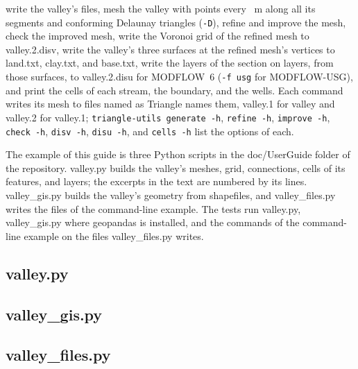 \documentclass[11pt,twoside,twocolumn]{usgsreport}
\begin{document}

\noindent write the valley's files, mesh the valley with points every \boundaryspacing~m along all its segments and conforming Delaunay triangles (\texttt{-D}), refine and improve the mesh, check the improved mesh, write the Voronoi grid of the refined mesh to valley.2.disv, write the valley's three surfaces at the refined mesh's vertices to land.txt, clay.txt, and base.txt, write the layers of the section on layers, from those surfaces, to valley.2.disu for MODFLOW~6 (\texttt{-f usg} for MODFLOW-USG), and print the cells of each stream, the boundary, and the wells. Each command writes its mesh to files named as Triangle names them, valley.1 for valley and valley.2 for valley.1; \texttt{triangle-utils generate -h}, \texttt{refine -h}, \texttt{improve -h}, \texttt{check -h}, \texttt{disv -h}, \texttt{disu -h}, and \texttt{cells -h} list the options of each.

\REFSECTION



\begin{appendix}
\label{appendix:listings}

The example of this guide is three Python scripts in the doc/UserGuide folder of the repository. valley.py builds the valley's meshes, grid, connections, cells of its features, and layers; the excerpts in the text are numbered by its lines. valley\_gis.py builds the valley's geometry from shapefiles, and valley\_files.py writes the files of the command-line example. The tests run valley.py, valley\_gis.py where geopandas is installed, and the commands of the command-line example on the files valley\_files.py writes.

\subsection*{valley.py}


\subsection*{valley\_gis.py}


\subsection*{valley\_files.py}

\end{appendix}
\end{document}
